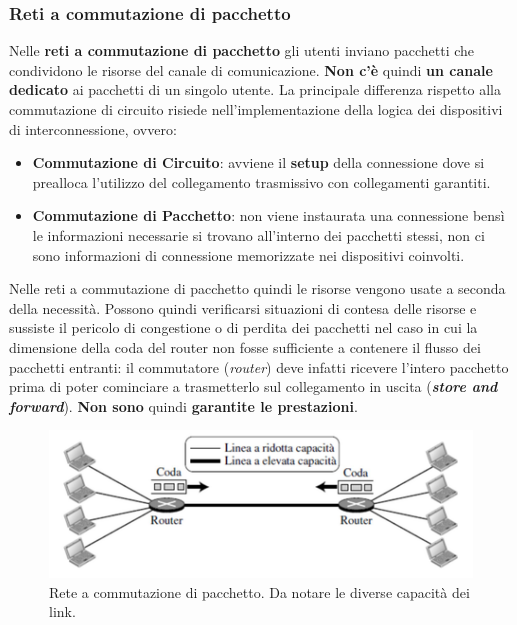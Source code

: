 \documentclass[11pt,a4paper]{article}
\theoremstyle{definition}
\begin{document}
\subsubsection{Reti a commutazione di pacchetto}
Nelle \textbf{reti a commutazione di pacchetto} gli utenti inviano pacchetti che condividono le risorse del canale di comunicazione. \textbf{Non c'è} quindi \textbf{un canale dedicato} ai pacchetti di un singolo utente. La principale differenza rispetto alla commutazione di circuito risiede nell'implementazione della logica dei dispositivi di interconnessione, ovvero:
\begin{itemize}
	\item \textbf{Commutazione di Circuito}: avviene il \textbf{setup} della connessione dove  si prealloca l’utilizzo del collegamento trasmissivo con collegamenti
	      garantiti.
	\item \textbf{Commutazione di Pacchetto}: non viene instaurata una connessione bensì le informazioni necessarie si trovano all'interno dei pacchetti stessi, non ci sono informazioni di connessione memorizzate nei dispositivi coinvolti.
\end{itemize}
Nelle reti a commutazione di pacchetto quindi le risorse vengono usate a seconda della necessità. Possono quindi verificarsi situazioni di contesa delle risorse e sussiste il pericolo di congestione o di perdita dei pacchetti nel caso in cui la dimensione della coda del router non fosse sufficiente a contenere il flusso dei pacchetti entranti: il commutatore (\textit{router}) deve infatti ricevere l’intero
pacchetto prima di poter cominciare a trasmetterlo sul collegamento in uscita (\textit{\textbf{store and forward}}). \textbf{Non sono} quindi \textbf{garantite le prestazioni}.
\begin{figure}[!h]
	\includegraphics[scale=0.5]{Immagini/Packet_Switch.png}
	\centering
	\caption{Rete a commutazione di pacchetto. Da notare le diverse capacità dei link.}
\end{figure}
\newpage
\end{document}

